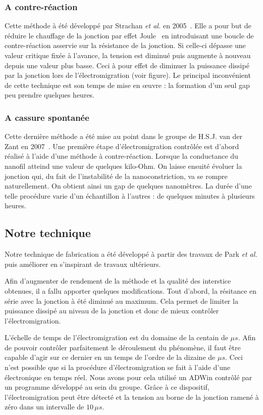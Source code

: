 \subsubsection{A contre-réaction}
Cette méthode à été développé par Strachan \textit{et al.} en 2005~\cite{Strachan2005}. Elle a pour but de réduire le chauffage de la jonction par effet Joule~\cite{Esen2005} en introduisant une boucle de contre-réaction asservie sur la résistance de la jonction. Si celle-ci dépasse une valeur critique fixée à l'avance, la tension est diminué puis augmente à nouveau depuis une valeur plus basse. Ceci à pour effet de diminuer la puissance dissipé par la jonction lors de l'électromigration (voir figure). Le principal inconvénient de cette technique est son temps de mise en œuvre : la formation d'un seul gap peu prendre quelques heures.

\subsubsection{A cassure spontanée}
Cette dernière méthode a été mise au point dans le groupe de H.S.J. van der Zant en 2007~\cite{ONeill2007}. Une première étape d'électromigration contrôlée est d'abord réalisé à l'aide d'une méthode à contre-réaction. Lorsque la conductance du nanofil atteind une valeur de quelques kilo-Ohm. On laisse ensuité évoluer la jonction qui, du fait de l'instabilité de la nanoconstriction, va se rompre naturellement. On obtient ainsi un gap de quelques nanomètres. La durée d'une telle procédure varie d'un échantillon à l'autres : de quelques minutes à plusieurs heures.

\subsection{Notre technique}
Notre technique de fabrication a été développé à partir des travaux de Park \textit{et al.} puis améliorer en s'inspirant de travaux ultérieurs.

Afin d'augmenter de rendement de la méthode et la qualité des interstice obtenues, il a fallu apporter quelques modifications. Tout d’abord, la résitance en série avec la jonction à été diminué au maximum. Cela permet de limiter la puissance dissipé au niveau de la jonction et donc de mieux contrôler l'électromigration.

L'échelle de temps de l'électromigration est du domaine de la centain de $\mu s$. Afin de pouvoir contrôler parfaitement le déroulement du phénomène, il faut être capable d'agir sur ce dernier en un temps de l'ordre de la dizaine de $\mu s$. Ceci n'est possible que si la procédure d'électromigration se fait à l'aide d'une électronique en temps réel. Nous avons pour cela utilisé un ADWin contrôlé par un programme développé au sein du groupe. Grâce à ce dispositif, l'électromigration peut être détecté et la tension au borne de la jonction ramené à zéro dans un intervalle de $10\, \mu s$.

